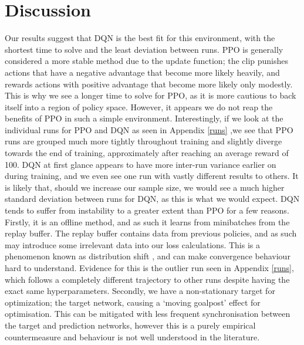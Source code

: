 \documentclass{article}
\begin{document}
\section{Discussion}
Our results suggest that DQN is the best fit for this environment, with the shortest time to solve and the least deviation between runs. PPO is generally considered a more stable method due to the update function; the clip punishes actions that have a negative advantage that become more likely heavily, and rewards actions with positive advantage that become more likely only modestly. This is why we see a longer time to solve for PPO, as it is more cautious to back itself into a region of policy space. However, it appears we do not reap the benefits of PPO in such a simple environment. Interestingly, if we look at the individual runs for PPO and DQN as seen in Appendix \ref{runs}
,we see that PPO runs are grouped much more tightly throughout training and slightly diverge towards the end of training, approximately after reaching an average reward of 100. DQN at first glance appears to have more inter-run variance earlier on during training, and we even see one run with vastly different results to others. It is likely that, should we increase our sample size, we would see a much higher standard deviation between runs for DQN, as this is what we would expect. DQN tends to suffer from instability to a greater extent than PPO for a few reasons. Firstly, it is an offline method, and as such it learns from minibatches from the replay buffer. The replay buffer contains data from previous policies, and as such may introduce some irrelevant data into our loss calculations. This is a phenomenon known as distribution shift \citep{pmlr-v97-fu19a}, and can make convergence behaviour hard to understand. Evidence for this is the outlier run seen in Appendix \ref{runs}, which follows a completely different trajectory to other runs despite having the exact same hyperparameters. 
Secondly, we have a non-stationary target for optimization; the target network, causing a `moving goalpost' effect for optimisation. This can be mitigated with less frequent synchronisation between the target and prediction networks, however this is a purely empirical countermeasure and behaviour is not well understood in the literature.\\\newline
\end{document}
